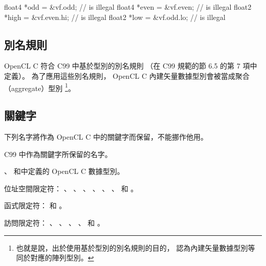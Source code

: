 float4	*odd = &vf.odd;		// is illegal
float4	*even = &vf.even;	// is illegal
float2	*high = &vf.even.hi;	// is illegal
float2	*low = &vf.odd.lo;	// is illegal
\stopclc

\subsection{別名規則}

OpenCL C  符合 C99 中基於型別的別名規則
（在 C99 規範的節 6.5 的第 7 項中定義）。
為了應用這些別名規則， OpenCL C 內建矢量數據型別會被當成聚合（aggregate）型別
\footnote{也就是說，出於使用基於型別的別名規則的目的，
認為內建矢量數據型別等同於對應的陣列型別。}。

\subsection{關鍵字}

下列名字將作為 OpenCL C 中的關鍵字而保留，不能挪作他用。
\startigBase
\item C99 中作為關鍵字所保留的名字。

\item {}、
和中定義的 OpenCL C 數據型別。

\item 位址空間限定符：
 、 、 、 、
 、 、  和 。

\item 函式限定符：  和 。

\item 訪問限定符：
 、 、 、 、
  和 。
\stopigBase

